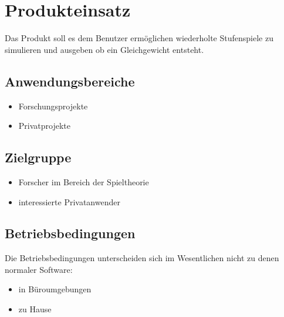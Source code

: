 \section{Produkteinsatz}
Das Produkt soll es dem Benutzer ermöglichen wiederholte Stufenspiele zu simulieren und ausgeben ob ein Gleichgewicht entsteht.

\subsection{Anwendungsbereiche}
\begin{itemize}
\item Forschungsprojekte
\item Privatprojekte
\end{itemize}

\subsection{Zielgruppe}
\begin{itemize}
\item Forscher im Bereich der Spieltheorie
\item interessierte Privatanwender
\end{itemize}

\subsection{Betriebsbedingungen}
Die Betriebsbedingungen unterscheiden sich im Wesentlichen nicht zu denen normaler Software:
\begin{itemize}
\item in Büroumgebungen
\item zu Hause
\end{itemize}